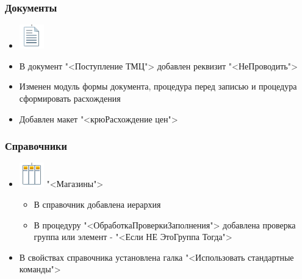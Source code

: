 \subsubsection{Документы}
\begin{itemize}	
	    \item \includegraphics[width=0.02\linewidth]{images/doc}
	   	\item В документ "<Поступление ТМЦ"> добавлен реквизит "<НеПроводить">
	   	\item Изменен модуль формы документа, процедура перед записью  и процедура сформировать расхождения 
	   	\item Добавлен макет "<крюРасхождение цен">
\end{itemize}

\subsubsection{Справочники}
\begin{itemize}	
	\item \includegraphics[width=0.02\linewidth]{images/sp}
	"<Магазины">
	\begin{itemize}	
		\item В справочник добавлена иерархия
		\item В процедуру "<ОбработкаПроверкиЗаполнения"> добавлена проверка группа или элемент - 
		"<Если НЕ ЭтоГруппа Тогда">
	\end{itemize}
    \item В свойствах справочника установлена галка "<Использовать стандартные команды">
\end{itemize}

%



%







	